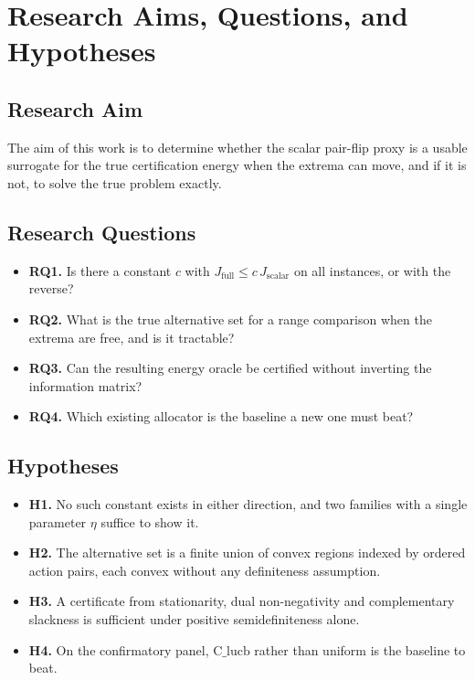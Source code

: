 \documentclass[conference]{IEEEtran}
\theoremstyle{definition}
\begin{document}
\section{Research Aims, Questions, and Hypotheses}

\subsection{Research Aim}

The aim of this work is to determine whether the scalar pair-flip proxy is a usable surrogate
for the true certification energy when the extrema can move, and if it is not, to solve the
true problem exactly.

\subsection{Research Questions}

\begin{itemize}
\item \textbf{RQ1.} Is there a constant $c$ with $J_{\mathrm{full}}\le c\,J_{\mathrm{scalar}}$
on all instances, or with the reverse?
\item \textbf{RQ2.} What is the true alternative set for a range comparison when the extrema
are free, and is it tractable?
\item \textbf{RQ3.} Can the resulting energy oracle be certified without inverting the
information matrix?
\item \textbf{RQ4.} Which existing allocator is the baseline a new one must beat?
\end{itemize}

\subsection{Hypotheses}

\begin{itemize}
\item \textbf{H1.} No such constant exists in either direction, and two families with a single
parameter $\eta$ suffice to show it.
\item \textbf{H2.} The alternative set is a finite union of convex regions indexed by ordered
action pairs, each convex without any definiteness assumption.
\item \textbf{H3.} A certificate from stationarity, dual non-negativity and complementary
slackness is sufficient under positive semidefiniteness alone.
\item \textbf{H4.} On the confirmatory panel, $\mathrm{C\_lucb}$ rather than uniform is the
baseline to beat.
\end{itemize}
\end{document}
